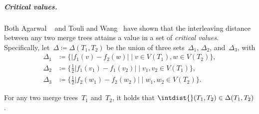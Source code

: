 %
\subparagraph{Critical values.}
Both Agarwal \etal~\cite{agarwal2018computing} and Touli and Wang~\cite{touli2022fpt} have shown that the interleaving distance between any two merge trees attains a value in a set of \emph{critical values}.
Specifically, let~$\Delta \coloneqq \Delta(T_1, T_2)$ be the union of three sets~$\Delta_1$, $\Delta_2$, and~$\Delta_3$, with
\begin{align}\label{eq:critical-values}
	\Delta_1 &\coloneqq \{|f_1(v) - f_2(w)| \mid v \in V(T_1), w \in V(T_2)\},\nonumber\\
	\Delta_2 &\coloneqq \{\tfrac{1}{2} |f_1(v_1) - f_1(v_2)| \mid v_1, v_2 \in V(T_1)\},\\ 
	\Delta_3 &\coloneqq \{\tfrac{1}{2} |f_2(w_1) - f_2(w_2)| \mid w_1, w_2 \in V(T_2)\}.\nonumber
\end{align}
%
\begin{lemma}\label{lem:critical-values}
	For any two merge trees~$T_1$ and~$T_2$, it holds that $\intdist{}(T_1, T_2) \in \Delta(T_1, T_2)$.
\end{lemma}
%
